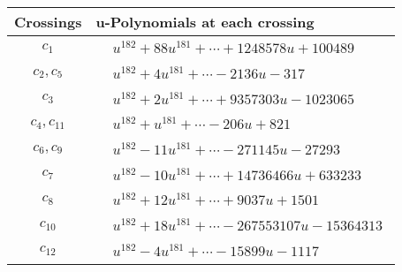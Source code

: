 \documentclass[1p]{elsarticle_modified}
\theoremstyle{definition}
\begin{document}
\begin{tabular}{m{50pt}|m{274pt}}
Crossings & \hspace{64pt}u-Polynomials at each crossing \\
\hline $$\begin{aligned}c_{1}\end{aligned}$$&$\begin{aligned}
&u^{182}+88 u^{181}+\cdots+1248578 u+100489
\end{aligned}$\\
\hline $$\begin{aligned}c_{2},c_{5}\end{aligned}$$&$\begin{aligned}
&u^{182}+4 u^{181}+\cdots-2136 u-317
\end{aligned}$\\
\hline $$\begin{aligned}c_{3}\end{aligned}$$&$\begin{aligned}
&u^{182}+2 u^{181}+\cdots+9357303 u-1023065
\end{aligned}$\\
\hline $$\begin{aligned}c_{4},c_{11}\end{aligned}$$&$\begin{aligned}
&u^{182}+u^{181}+\cdots-206 u+821
\end{aligned}$\\
\hline $$\begin{aligned}c_{6},c_{9}\end{aligned}$$&$\begin{aligned}
&u^{182}-11 u^{181}+\cdots-271145 u-27293
\end{aligned}$\\
\hline $$\begin{aligned}c_{7}\end{aligned}$$&$\begin{aligned}
&u^{182}-10 u^{181}+\cdots+14736466 u+633233
\end{aligned}$\\
\hline $$\begin{aligned}c_{8}\end{aligned}$$&$\begin{aligned}
&u^{182}+12 u^{181}+\cdots+9037 u+1501
\end{aligned}$\\
\hline $$\begin{aligned}c_{10}\end{aligned}$$&$\begin{aligned}
&u^{182}+18 u^{181}+\cdots-267553107 u-15364313
\end{aligned}$\\
\hline $$\begin{aligned}c_{12}\end{aligned}$$&$\begin{aligned}
&u^{182}-4 u^{181}+\cdots-15899 u-1117
\end{aligned}$\\
\hline
\end{tabular}\\~\\
\end{document}
